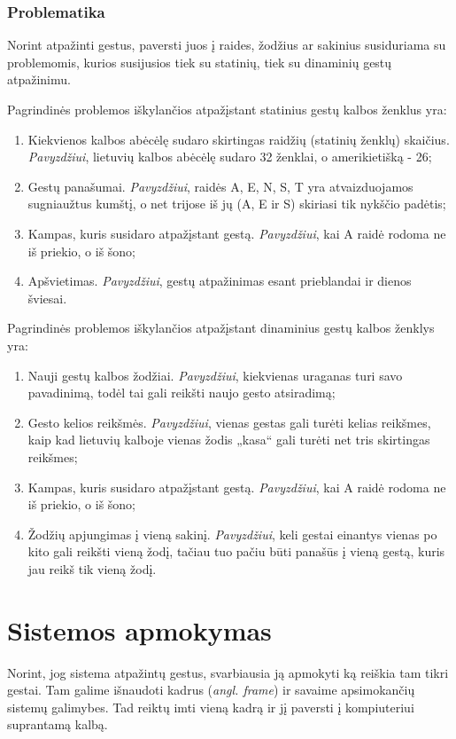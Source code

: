 \documentclass{VUMIFInfKursinis}
\begin{document}
\subsubsection{Problematika}
Norint atpažinti gestus, paversti juos į raides, žodžius ar sakinius susiduriama su problemomis, kurios susijusios tiek su statinių, tiek su dinaminių gestų atpažinimu.

Pagrindinės problemos iškylančios atpažįstant statinius gestų kalbos ženklus yra:
\begin{enumerate}
	\item Kiekvienos kalbos abėcėlę sudaro skirtingas raidžių (statinių ženklų) skaičius. \textit{Pavyzdžiui}, lietuvių kalbos abėcėlę sudaro 32 ženklai, o amerikietišką - 26; 
	\item Gestų panašumai. \textit{Pavyzdžiui}, raidės A, E, N, S, T yra atvaizduojamos sugniaužtus kumštį, o net trijose iš jų (A, E ir S) skiriasi tik nykščio padėtis;
	\item Kampas, kuris susidaro atpažįstant gestą. \textit{Pavyzdžiui}, kai A raidė rodoma ne iš priekio, o iš šono;
	\item Apšvietimas. \textit{Pavyzdžiui}, gestų atpažinimas esant prieblandai ir dienos šviesai.
\end{enumerate}

Pagrindinės problemos iškylančios atpažįstant dinaminius gestų kalbos ženklys yra:
\begin{enumerate}
	\item Nauji gestų kalbos žodžiai. \textit{Pavyzdžiui}, kiekvienas uraganas turi savo pavadinimą, todėl tai gali reikšti naujo gesto atsiradimą; 
	\item Gesto kelios reikšmės. \textit{Pavyzdžiui}, vienas gestas gali turėti kelias reikšmes, kaip kad lietuvių kalboje vienas žodis „kasa“ gali turėti net tris skirtingas reikšmes;
	\item Kampas, kuris susidaro atpažįstant gestą. \textit{Pavyzdžiui}, kai A raidė rodoma ne iš priekio, o iš šono;
	\item Žodžių apjungimas į vieną sakinį. \textit{Pavyzdžiui}, keli gestai einantys vienas po kito gali reikšti vieną žodį, tačiau tuo pačiu būti panašūs į vieną gestą, kuris jau reikš tik vieną žodį.
\end{enumerate}

\section{Sistemos apmokymas}
Norint, jog sistema atpažintų gestus, svarbiausia ją apmokyti ką reiškia tam tikri gestai. Tam galime išnaudoti kadrus (\textit{angl. frame}) ir savaime apsimokančių sistemų galimybes. Tad reiktų imti vieną kadrą ir jį paversti į kompiuteriui suprantamą kalbą. 
\end{document}
